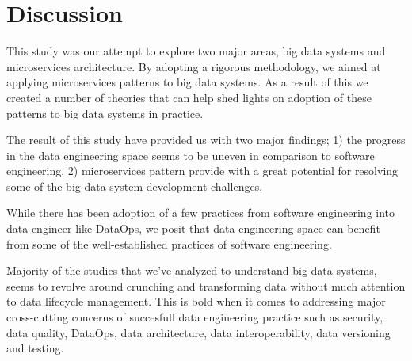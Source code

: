 \documentclass[conference]{IEEEtran}
\begin{document}
\section{Discussion}
This study was our attempt to explore two major areas, big data systems and microservices architecture. By adopting a rigorous methodology, we aimed at applying microservices patterns to big data systems. As a result of this we created a number of theories that can help shed lights on adoption of these patterns to big data systems in practice. 



The result of this study have provided us with two major findings; 1) the progress in the data engineering space seems to be uneven in comparison to software engineering, 2) microservices pattern provide with a great potential for resolving some of the big data system development challenges. 

While there has been adoption of a few practices from software engineering into data engineer like DataOps, we posit that data engineering space can benefit from some of the well-established practices of software engineering. 

Majority of the studies that we've analyzed to understand big data systems, seems to revolve around crunching and transforming data without much attention to data lifecycle management. This is bold when it comes to addressing major cross-cutting concerns of succesfull data engineering practice such as security, data quality, DataOps, data architecture, data interoperability, data versioning and testing. 
\end{document}
